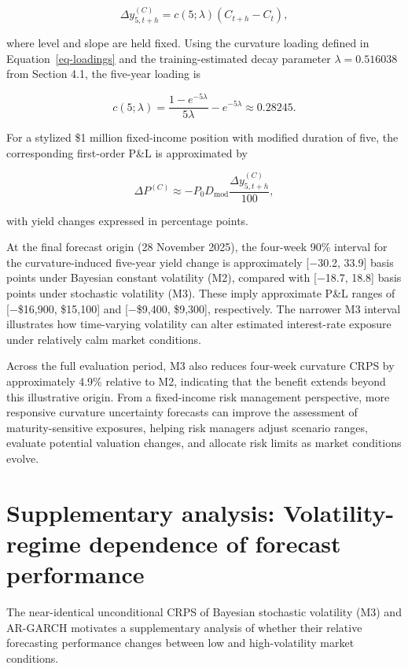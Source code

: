 \documentclass[
  12pt,
  letterpaper,
  DIV=11,
  numbers=noendperiod]{scrreprt}
\begin{document}
\[
\Delta y_{5,t+h}^{(C)}
=c(5;\lambda)(C_{t+h}-C_t),
\]

where level and slope are held fixed. Using the curvature loading
defined in Equation~\ref{eq-loadings} and the training-estimated decay
parameter \(\lambda=0.516038\) from Section 4.1, the five-year loading
is

\[
c(5;\lambda)=\frac{1-e^{-5\lambda}}{5\lambda}-e^{-5\lambda}
\approx 0.28245.
\]

For a stylized \$1 million fixed-income position with modified duration
of five, the corresponding first-order P\&L is approximated by

\[
\Delta P^{(C)}
\approx -P_0D_{\mathrm{mod}}\frac{\Delta y_{5,t+h}^{(C)}}{100},
\]

with yield changes expressed in percentage points.

At the final forecast origin (28 November 2025), the four-week 90\%
interval for the curvature-induced five-year yield change is
approximately {[}−30.2, 33.9{]} basis points under Bayesian constant
volatility (M2), compared with {[}−18.7, 18.8{]} basis points under
stochastic volatility (M3). These imply approximate P\&L ranges of
{[}−\$16,900, \$15,100{]} and {[}−\$9,400, \$9,300{]}, respectively. The
narrower M3 interval illustrates how time-varying volatility can alter
estimated interest-rate exposure under relatively calm market
conditions.

Across the full evaluation period, M3 also reduces four-week curvature
CRPS by approximately 4.9\% relative to M2, indicating that the benefit
extends beyond this illustrative origin. From a fixed-income risk
management perspective, more responsive curvature uncertainty forecasts
can improve the assessment of maturity-sensitive exposures, helping risk
managers adjust scenario ranges, evaluate potential valuation changes,
and allocate risk limits as market conditions evolve.

\section{Supplementary analysis: Volatility-regime dependence of
forecast
performance}\label{supplementary-analysis-volatility-regime-dependence-of-forecast-performance}

The near-identical unconditional CRPS of Bayesian stochastic volatility
(M3) and AR-GARCH motivates a supplementary analysis of whether their
relative forecasting performance changes between low and high-volatility
market conditions.
\end{document}
